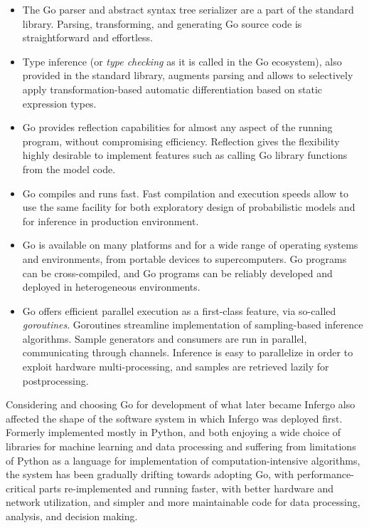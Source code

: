 \documentclass[sigplan,review,10pt,anonymous]{acmart}
\begin{document}
\begin{sloppypar}
\begin{itemize}
  \item The Go parser and abstract syntax tree serializer are
    a part of the standard library. Parsing, transforming,
    and generating Go source code is straightforward and
    effortless.
  \item Type inference (or \textit{type checking} as it is
    called in the Go ecosystem), also provided in the
    standard library, augments parsing and allows to
    selectively apply transformation-based automatic
    differentiation  based on static expression types. 
  \item Go provides reflection capabilities for almost any aspect
    of the running program, without compromising efficiency.
    Reflection gives the flexibility highly desirable to
    implement features such as calling Go library
    functions from the model code.
  \item Go compiles and runs fast. Fast compilation and
    execution speeds allow to use the same facility for both
    exploratory design of probabilistic models and for
    inference in production environment.
  \item Go is available on many platforms and for a wide range
    of operating systems and environments, from portable
    devices to supercomputers. Go programs can be
    cross-compiled, and Go programs can be reliably
    developed and deployed in heterogeneous environments.
  \item Go offers efficient parallel execution as a
    first-class feature, via so-called \textit{goroutines}.
    Goroutines streamline implementation of sampling-based
    inference algorithms. Sample generators and consumers
    are run in parallel, communicating through channels. 
    Inference is easy to parallelize in order to exploit
    hardware multi-processing, and samples are retrieved
    lazily for postprocessing. 
\end{itemize}

Considering and choosing Go for development of what later became
Infergo also affected the shape of the software system in which
Infergo was deployed first. Formerly implemented mostly in
Python, and both enjoying a wide choice of libraries for machine
learning and data processing and suffering from limitations of
Python as a language for implementation of computation-intensive
algorithms, the system has been gradually drifting towards
adopting Go, with performance-critical parts re-implemented and
running faster, with better hardware and network utilization,
and simpler and more maintainable code for data processing,
analysis, and decision making.


\end{sloppypar}
\end{document}
